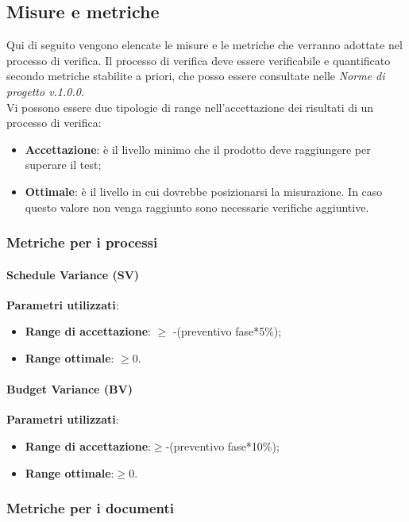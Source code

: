 \documentclass[12pt,a4paper,titlepage]{article}
\begin{document}
	\subsection{Misure e metriche}
	\label{MisureMetriche}
	Qui di seguito vengono elencate le misure e le metriche che verranno adottate nel processo di verifica. Il processo di verifica deve essere verificabile e quantificato secondo metriche stabilite a priori, che posso essere consultate nelle \textit{Norme di progetto v.1.0.0}.\\
	Vi possono essere due tipologie di range nell'accettazione dei risultati di un processo di verifica:
	\begin{itemize}
		\item \textbf{Accettazione}: è il livello minimo che il prodotto deve raggiungere per superare il test;
		\item \textbf{Ottimale}: è il livello in cui dovrebbe posizionarsi la misurazione. In caso questo valore non venga raggiunto sono necessarie verifiche aggiuntive.
	\end{itemize}

		\subsubsection{Metriche per i processi}
			\paragraph{Schedule Variance (SV)}
			\textbf{Parametri utilizzati}:
			\begin{itemize}
				\item \textbf{Range di accettazione}: $\geq$ -(preventivo fase*5\%);
				\item \textbf{Range ottimale}: $\geq0$.
			\end{itemize}
		
			\paragraph{Budget Variance (BV)}
			\textbf{Parametri utilizzati}:
			\begin{itemize}
				\item \textbf{Range di accettazione}:$\geq$-(preventivo fase*10\%);
				\item \textbf{Range ottimale}:$\geq0$.
			\end{itemize}
		
		\subsubsection{Metriche per i documenti}
\end{document}
